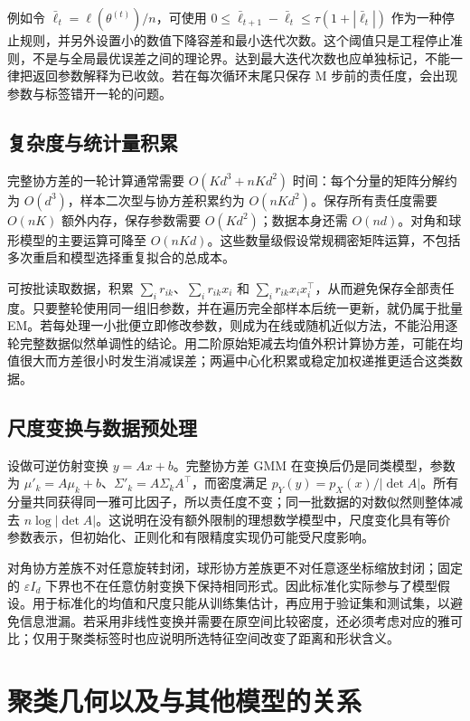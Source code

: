\documentclass[UTF8,12pt,a4paper,fontset=fandol]{ctexart}
\begin{document}
例如令 $\bar\ell_t=\ell(\theta^{(t)})/n$，可使用 $0\leq\bar\ell_{t+1}-\bar\ell_t\leq\tau(1+|\bar\ell_t|)$ 作为一种停止规则，并另外设置小的数值下降容差和最小迭代次数。这个阈值只是工程停止准则，不是与全局最优误差之间的理论界。达到最大迭代次数也应单独标记，不能一律把返回参数解释为已收敛。若在每次循环末尾只保存 M 步前的责任度，会出现参数与标签错开一轮的问题。

\subsection{复杂度与统计量积累}
完整协方差的一轮计算通常需要 $O(Kd^3+nKd^2)$ 时间：每个分量的矩阵分解约为 $O(d^3)$，样本二次型与协方差积累约为 $O(nKd^2)$。保存所有责任度需要 $O(nK)$ 额外内存，保存参数需要 $O(Kd^2)$；数据本身还需 $O(nd)$。对角和球形模型的主要运算可降至 $O(nKd)$。这些数量级假设常规稠密矩阵运算，不包括多次重启和模型选择重复拟合的总成本。

可按批读取数据，积累 $\sum_i r_{ik}$、$\sum_i r_{ik}x_i$ 和 $\sum_i r_{ik}x_ix_i^\top$，从而避免保存全部责任度。只要整轮使用同一组旧参数，并在遍历完全部样本后统一更新，就仍属于批量 EM。若每处理一小批便立即修改参数，则成为在线或随机近似方法，不能沿用逐轮完整数据似然单调性的结论。用二阶原始矩减去均值外积计算协方差，可能在均值很大而方差很小时发生消减误差；两遍中心化积累或稳定加权递推更适合这类数据。

\subsection{尺度变换与数据预处理}
设做可逆仿射变换 $y=Ax+b$。完整协方差 GMM 在变换后仍是同类模型，参数为 $\mu'_k=A\mu_k+b$、$\Sigma'_k=A\Sigma_kA^\top$，而密度满足 $p_Y(y)=p_X(x)/|\det A|$。所有分量共同获得同一雅可比因子，所以责任度不变；同一批数据的对数似然则整体减去 $n\log|\det A|$。这说明在没有额外限制的理想数学模型中，尺度变化具有等价参数表示，但初始化、正则化和有限精度实现仍可能受尺度影响。

对角协方差族不对任意旋转封闭，球形协方差族更不对任意逐坐标缩放封闭；固定的 $\varepsilon I_d$ 下界也不在任意仿射变换下保持相同形式。因此标准化实际参与了模型假设。用于标准化的均值和尺度只能从训练集估计，再应用于验证集和测试集，以避免信息泄漏。若采用非线性变换并需要在原空间比较密度，还必须考虑对应的雅可比；仅用于聚类标签时也应说明所选特征空间改变了距离和形状含义。

\section{聚类几何以及与其他模型的关系}
\label{sec:gmm-relations}
\end{document}
